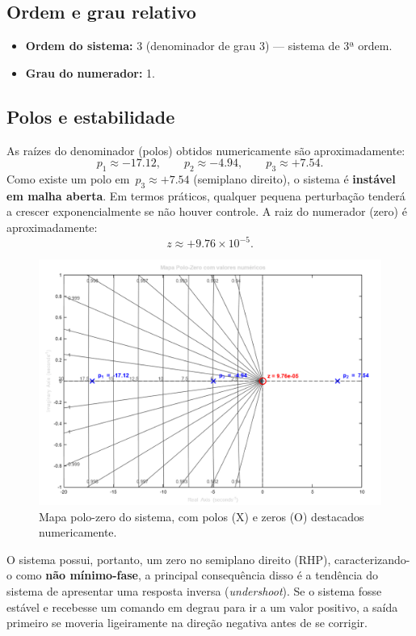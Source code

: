 \documentclass[9pt,a4paper,twocolumn,twoside]{tau-class/tau}
\begin{document}
\subsection{Ordem e grau relativo}
\begin{itemize}
    \item \textbf{Ordem do sistema:} 3 (denominador de grau 3) — sistema de 3ª ordem.
    \item \textbf{Grau do numerador:} 1.
\end{itemize}

\subsection{Polos e estabilidade}
As raízes do denominador (polos) obtidos numericamente são aproximadamente:
\[
p_1 \approx -17.12,\qquad p_2 \approx -4.94,\qquad p_3 \approx +7.54.
\]
Como existe um polo em \(\,p_3 \approx +7.54\) (semiplano direito), o sistema é \textbf{instável em malha aberta}. Em termos práticos, qualquer pequena perturbação tenderá a crescer exponencialmente se não houver controle.
A raiz do numerador (zero) é aproximadamente:
\[
z \approx +9.76\times 10^{-5}.
\]

\begin{figure}[H]
    \centering
    \includegraphics[width=\columnwidth]{figures/polos_e_zeros.png}
    \caption{Mapa polo-zero do sistema, com polos (X) e zeros (O) destacados numericamente.}
    \label{fig:pzmap}
\end{figure}

O sistema possui, portanto, um zero no semiplano direito (RHP), caracterizando-o como \textbf{não mínimo-fase}, a principal consequência disso é a tendência do sistema de apresentar uma resposta inversa (\textit{undershoot}). Se o sistema fosse estável e recebesse um comando em degrau para ir a um valor positivo, a saída primeiro se moveria ligeiramente na direção negativa antes de se corrigir.
\end{document}
